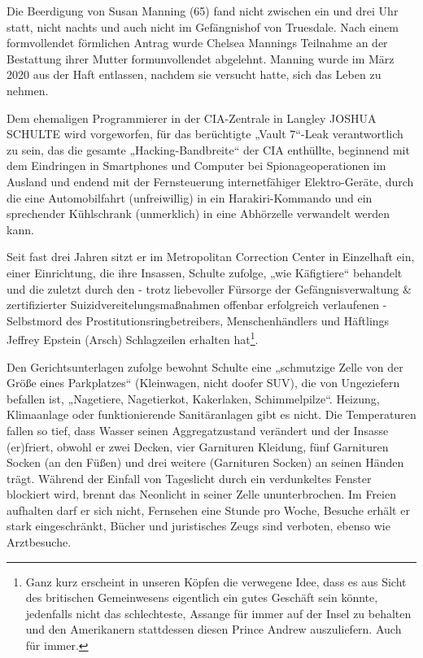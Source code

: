 \begin{multicols}{2}
Die Beerdigung von Susan Manning (65) fand nicht
zwischen ein und drei Uhr statt, nicht nachts und auch
nicht im Gefängnishof von Truesdale. Nach einem formvollendet förmlichen Antrag wurde Chelsea Mannings
Teilnahme an der Bestattung ihrer Mutter formunvollendet abgelehnt. Manning wurde im März 2020 aus der
Haft entlassen, nachdem sie versucht hatte, sich das Leben zu nehmen.

Dem ehemaligen Programmierer in der CIA-Zentrale in
Langley JOSHUA SCHULTE wird vorgeworfen, für das
berüchtigte „Vault 7“-Leak verantwortlich zu sein, das
die gesamte „Hacking-Bandbreite“ der CIA enthüllte, beginnend mit dem Eindringen in Smartphones und Computer bei Spionageoperationen im Ausland und endend
mit der Fernsteuerung internetfähiger Elektro-Geräte,
durch die eine Automobilfahrt (unfreiwillig) in ein Harakiri-Kommando und ein sprechender Kühlschrank (unmerklich) in eine Abhörzelle verwandelt werden kann.

Seit fast drei Jahren sitzt er im Metropolitan Correction
Center in Einzelhaft ein, einer Einrichtung, die ihre Insassen, Schulte zufolge, „wie Käfigtiere“ behandelt und die zuletzt durch den - trotz liebevoller Fürsorge der Gefängnisverwaltung \& zertifizierter Suizidvereitelungsmaßnahmen offenbar erfolgreich verlaufenen - Selbstmord
des Prostitutionsringbetreibers, Menschenhändlers und
Häftlings Jeffrey Epstein (Arsch) Schlagzeilen erhalten
hat\footnote[16]{Ganz kurz erscheint in unseren Köpfen die verwegene Idee, dass es aus Sicht des britischen Gemeinwesens
eigentlich ein gutes Geschäft sein könnte, jedenfalls nicht das schlechteste, Assange für immer auf der Insel zu
behalten und den Amerikanern stattdessen diesen Prince Andrew auszuliefern. Auch für immer.}.

Den Gerichtsunterlagen zufolge bewohnt Schulte eine
„schmutzige Zelle von der Größe eines Parkplatzes“
(Kleinwagen, nicht doofer SUV), die von Ungeziefern
befallen ist, „Nagetiere, Nagetierkot, Kakerlaken, Schimmelpilze“. Heizung, Klimaanlage oder funktionierende
Sanitäranlagen gibt es nicht. Die Temperaturen fallen so
tief, dass Wasser seinen Aggregatzustand verändert und
der Insasse (er)friert, obwohl er zwei Decken, vier Garnituren Kleidung, fünf Garnituren Socken (an den Füßen)
und drei weitere (Garnituren Socken) an seinen Händen
trägt.
Während der Einfall von Tageslicht durch ein verdunkeltes Fenster blockiert wird, brennt das Neonlicht in seiner
Zelle ununterbrochen. Im Freien aufhalten darf er sich
nicht, Fernsehen eine Stunde pro Woche, Besuche erhält
er stark eingeschränkt, Bücher und juristisches Zeugs
sind verboten, ebenso wie Arztbesuche.


\end{multicols}
